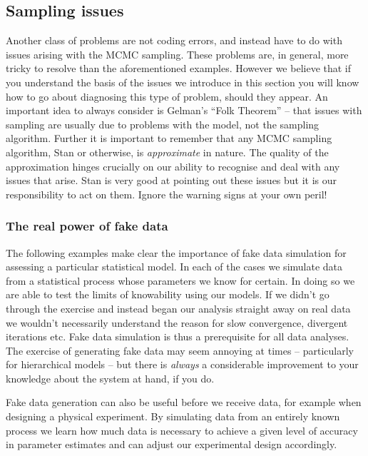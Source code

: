 \documentclass[11pt,fullpage]{book}
\begin{document}
\subsection{Sampling issues}\label{sec:StanJags_samplingIssues}
Another class of problems are not coding errors, and instead have to do with issues arising with the MCMC sampling. These problems are, in general, more tricky to resolve than the aforementioned examples. However we believe that if you understand the basis of the issues we introduce in this section you will know how to go about diagnosing this type of problem, should they appear. An important idea to always consider is Gelman's ``Folk Theorem'' -- that issues with sampling are usually due to problems with the model, not the sampling algorithm. Further it is important to remember that any MCMC sampling algorithm, Stan or otherwise, is \textit{approximate} in nature. The quality of the approximation hinges crucially on our ability to recognise and deal with any issues that arise. Stan is very good at pointing out these issues but it is our responsibility to act on them. Ignore the warning signs at your own peril! 

\subsubsection{The real power of fake data}
The following examples make clear the importance of fake data simulation for assessing a particular statistical model. In each of the cases we simulate data from a statistical process whose parameters we know for certain. In doing so we are able to test the limits of knowability using our models. If we didn't go through the exercise and instead began our analysis straight away on real data we wouldn't necessarily understand the reason for slow convergence, divergent iterations etc. Fake data simulation is thus a prerequisite for all data analyses. The exercise of generating fake data may seem annoying at times -- particularly for hierarchical models -- but there is \textit{always} a considerable improvement to your knowledge about the system at hand, if you do.

Fake data generation can also be useful before we receive data, for example when designing a physical experiment. By simulating data from an entirely known process we learn how much data is necessary to achieve a given level of accuracy in parameter estimates and can adjust our experimental design accordingly.
\end{document}
